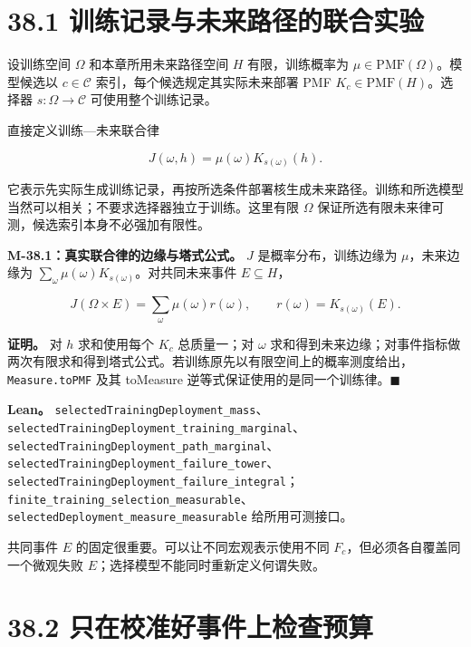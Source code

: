 \documentclass[
  11pt,
  oneside]{book}
\begin{document}
\section{38.1 训练记录与未来路径的联合实验}\label{ux8badux7ec3ux8bb0ux5f55ux4e0eux672aux6765ux8defux5f84ux7684ux8054ux5408ux5b9eux9a8c}

设训练空间 \(\Omega\) 和本章所用未来路径空间 \(H\) 有限，训练概率为 \(\mu\in\mathrm{PMF}(\Omega)\)。模型候选以 \(c\in\mathcal C\) 索引，每个候选规定其实际未来部署 PMF \(K_c\in\mathrm{PMF}(H)\)。选择器 \(s:\Omega\to\mathcal C\) 可使用整个训练记录。

直接定义训练---未来联合律

\[J(\omega,h)=\mu(\omega)K_{s(\omega)}(h).\]

它表示先实际生成训练记录，再按所选条件部署核生成未来路径。训练和所选模型当然可以相关；不要求选择器独立于训练。这里有限 \(\Omega\) 保证所选有限未来律可测，候选索引本身不必强加有限性。

\hypertarget{m-38-1}{}\label{m-38-1}

\textbf{M-38.1：真实联合律的边缘与塔式公式。} \(J\) 是概率分布，训练边缘为 \(\mu\)，未来边缘为 \(\sum_\omega\mu(\omega)K_{s(\omega)}\)。对共同未来事件 \(E\subseteq H\)，

\[J(\Omega\times E)
=\sum_\omega\mu(\omega)r(\omega),
\qquad r(\omega)=K_{s(\omega)}(E).\]

\textbf{证明。} 对 \(h\) 求和使用每个 \(K_c\) 总质量一；对 \(\omega\) 求和得到未来边缘；对事件指标做两次有限求和得到塔式公式。若训练原先以有限空间上的概率测度给出，\nolinkurl{Measure.toPMF} 及其 toMeasure 逆等式保证使用的是同一个训练律。\(\blacksquare\)

\textbf{Lean。} \nolinkurl{selectedTrainingDeployment_mass}、\nolinkurl{selectedTrainingDeployment_training_marginal}、\nolinkurl{selectedTrainingDeployment_path_marginal}、\nolinkurl{selectedTrainingDeployment_failure_tower}、\nolinkurl{selectedTrainingDeployment_failure_integral}；\nolinkurl{finite_training_selection_measurable}、\nolinkurl{selectedDeployment_measure_measurable} 给所用可测接口。

共同事件 \(E\) 的固定很重要。可以让不同宏观表示使用不同 \(F_c\)，但必须各自覆盖同一个微观失败 \(E\)；选择模型不能同时重新定义何谓失败。

\section{38.2 只在校准好事件上检查预算}\label{ux53eaux5728ux6821ux51c6ux597dux4e8bux4ef6ux4e0aux68c0ux67e5ux9884ux7b97}
\end{document}
